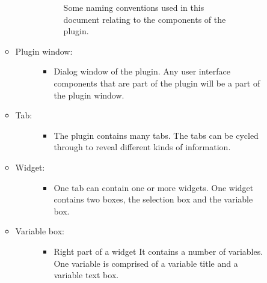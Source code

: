 \documentclass[letterpaper,10pt,english]{sphinxmanual}
\begin{document}
\begin{itemize}
\begin{description}
\begin{itemize}
\begin{description}
\begin{figure}[htbp]
\noindent{}
\caption{Some naming conventions used in this document relating to the components of the plugin.}\label{\detokenize{pre-processor/SUEWS Prepare:id1}}\end{figure}

\end{description}

\item {} \begin{description}
\item[{Plugin window:}] \leavevmode\begin{itemize}
\item {} 
Dialog window of the plugin. Any user interface components that are part of the plugin will be a part of the plugin window.

\end{itemize}

\end{description}

\item {} \begin{description}
\item[{Tab:}] \leavevmode\begin{itemize}
\item {} 
The plugin contains many tabs. The tabs can be cycled through to reveal different kinds of information.

\end{itemize}

\end{description}

\item {} \begin{description}
\item[{Widget:}] \leavevmode\begin{itemize}
\item {} 
One tab can contain one or more widgets. One widget contains two boxes, the selection box and the variable box.

\end{itemize}

\end{description}

\item {} \begin{description}
\item[{Variable box:}] \leavevmode\begin{itemize}
\item {} 
Right part of a widget It contains a number of variables. One variable is comprised of a variable title and a variable text box.


\end{itemize}
\end{description}
\end{itemize}
\end{description}
\end{itemize}
\end{document}
